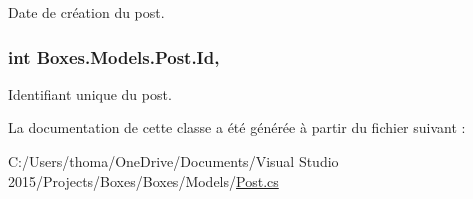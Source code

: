 Date de création du post. 

\subsubsection[{\texorpdfstring{Id}{Id}}]{\setlength{\rightskip}{0pt plus 5cm}int Boxes.\+Models.\+Post.\+Id\hspace{0.3cm}{\ttfamily [get]}, {\ttfamily [set]}}\hypertarget{class_boxes_1_1_models_1_1_post_ab0676174d7c3c1857357323f25e5a670}{}\label{class_boxes_1_1_models_1_1_post_ab0676174d7c3c1857357323f25e5a670}


Identifiant unique du post. 



La documentation de cette classe a été générée à partir du fichier suivant \+:\begin{DoxyCompactItemize}
\item 
C\+:/\+Users/thoma/\+One\+Drive/\+Documents/\+Visual Studio 2015/\+Projects/\+Boxes/\+Boxes/\+Models/\hyperlink{_post_8cs}{Post.\+cs}\end{DoxyCompactItemize}
